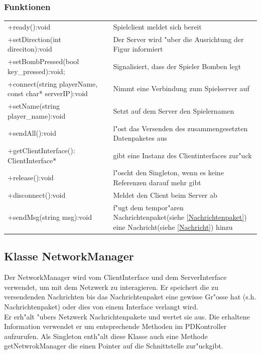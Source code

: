 \subsubsection{Funktionen}
\begin{tabular}{p{50mm}p{90mm}}
+ready():void 		 &Spielclient meldet sich bereit\\
+setDirection(int direciton):void 		 &Der Server wird "uber die Ausrichtung der Figur informiert\\
+setBombPressed(bool key\_pressed):void;				 &Signalisiert, dass der Spieler Bomben legt\\
+connect(string playerName, const char* serverIP):void		 &Nimmt eine Verbindung zum Spielserver auf\\
+setName(string player\_name):void&Setzt auf dem Server den Spielernamen\\
+sendAll():void 				 	 &l"ost das Versenden des zusammengesetzten Datenpaketes aus\\
+getClientInterface(): ClientInterface*&gibt eine Instanz des Clientinterfaces zur"uck\\
+release():void&l"oscht den Singleton, wenn es keine Referenzen darauf mehr gibt\\
+disconnect():void&Meldet den Client beim Server ab\\
+sendMsg(string msg):void&f"ugt dem tempor"aren Nachrichtenpaket(siehe \ref{Nachrichtenpaket})
 eine Nachricht(siehe \ref{Nachricht}) hinzu\\
\end{tabular}


\subsection{Klasse NetworkManager}
Der NetworkManager wird vom ClientInterface und dem ServerInterface verwendet, um
mit dem Netzwerk zu interagieren. Er speichert die zu versendenden Nachrichten
bis das Nachrichtenpaket eine gewisse Gr"osse hat (s.h. Nachrichtenpaket) oder
dies von einem Interface verlangt wird.\\
Er erh"alt "ubers Netzwerk Nachrichtenpakete und wertet sie aus. Die erhaltene
Information verwendet er um entsprechende Methoden im PDKontroller aufzurufen.
Als Singleton enth"alt diese Klasse auch eine Methode getNetwrokManager die einen Pointer
auf die Schnittstelle zur"uckgibt.

